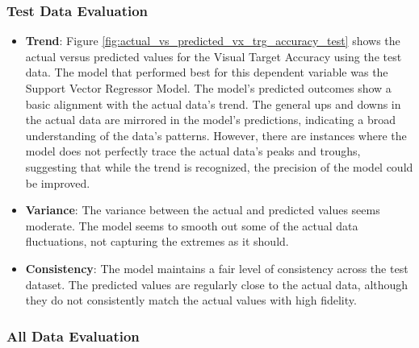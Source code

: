 \subsubsection*{Test Data Evaluation}

\begin{itemize}
    \item \textbf{Trend}: Figure \ref{fig:actual_vs_predicted_vx_trg_accuracy_test} shows the actual versus predicted values for the Visual Target Accuracy using the test data. The model that performed
    best for this dependent variable was the Support Vector Regressor Model. The model's predicted outcomes show a basic alignment with the actual data's trend. The general ups and downs in the actual data are
    mirrored in the model's predictions, indicating a broad understanding of the data's patterns. However, there are instances where the model does not perfectly trace the actual data's peaks and troughs, 
    suggesting that while the trend is recognized, the precision of the model could be improved.

    \item \textbf{Variance}: The variance between the actual and predicted values seems moderate. The model seems to smooth out some of the actual data fluctuations, not capturing the extremes as it should.
        
    \item \textbf{Consistency}: The model maintains a fair level of consistency across the test dataset. The predicted values are regularly close to the actual data, although they do not consistently match the
    actual values with high fidelity. 
    
\end{itemize}

\subsubsection*{All Data Evaluation}

